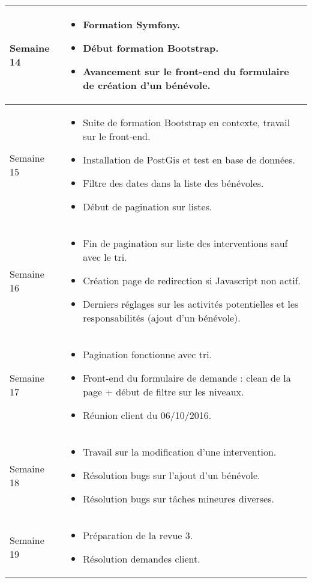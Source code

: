 \documentclass [a4paper] {article}
\begin{document}
\section*{\Francois}

\centering
	\begin{longtable}{|>{\columncolor{gray!40}}p{2cm}|p{12cm}|}
	\hline
	Semaine 14 & \begin{itemize}
	\item Formation Symfony.
	\item Début formation Bootstrap.
	\item Avancement sur le front-end du formulaire de création d'un bénévole.
	\end{itemize}	 \\
	\hline
	
	Semaine 15 & \begin{itemize}
	\item Suite de formation Bootstrap en contexte, travail sur le front-end.
	\item Installation de PostGis et test en base de données.
	\item Filtre des dates dans la liste des bénévoles.
	\item Début de pagination sur listes.
\end{itemize}	 \\
	\hline
	
	Semaine 16 & \begin{itemize}
	\item Fin de pagination sur liste des interventions sauf avec le tri.
	\item Création page de redirection si Javascript non actif.
	\item Derniers réglages sur les activités potentielles et les responsabilités (ajout d'un bénévole).
\end{itemize}	 \\
	\hline
	
	Semaine 17 & \begin{itemize}
	\item Pagination fonctionne avec tri.
	\item Front-end du formulaire de demande : clean de la page + début de filtre sur les niveaux.
	\item Réunion client du 06/10/2016.
\end{itemize}	 \\
	\hline
	
	Semaine 18 & \begin{itemize}
	\item Travail sur la modification d'une intervention.
	\item Résolution bugs sur l'ajout d'un bénévole.
	\item Résolution bugs sur tâches mineures diverses.
\end{itemize}	 \\
	\hline
	
	Semaine 19 & \begin{itemize}
	\item Préparation de la revue 3.
	\item Résolution demandes client.
\end{itemize}	 \\
	\hline
	
\end{longtable}
\end{document}
